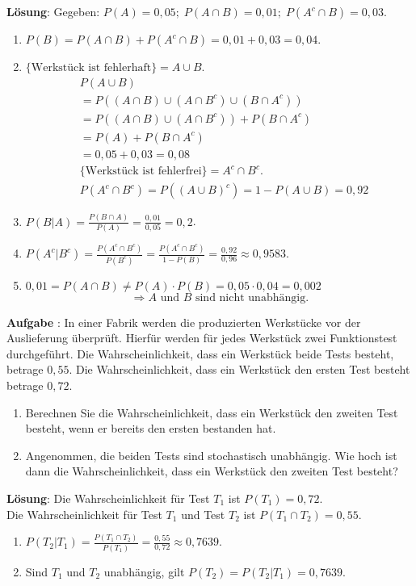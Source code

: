 \documentclass[a4paper,13pt]{scrartcl}
\newcommand{\exercise}{\vspace*{0.2cm}
\stepcounter{aufgabe}
\noindent
\textbf{Aufgabe \arabic{aufgabe}}: }
\newcounter{aufgabe}
\newcommand{\solution}{\vspace*{0.2cm}
\noindent
\textbf{Lösung}: }
\begin{document}
\solution
Gegeben: $P(A) = 0,05; \; P(A \cap B) = 0,01; \; P(A^c \cap B) = 0,03$.
\begin{enumerate}[label=(\alph*)]
\item $P(B) = P(A \cap B) + P(A^c \cap B) = 0,01 + 0,03 = 0,04$.
\item $ \{ \text{Werkstück ist fehlerhaft} \} = A \cup B$.
\begin{align*}
    & P(A \cup B) \\
    & = P((A \cap B) \cup (A \cap B^c) \cup (B \cap A^c))\\
    & = P((A \cap B) \cup (A \cap B^c)) + P(B \cap A^c)\\
    & = P(A) + P(B \cap A^c) \\
    & = 0,05 + 0,03 = 0,08\\
    & \{ \text{Werkstück ist fehlerfrei} \} = A^c \cap B^c.\\
    & P(A^c \cap B^c) = P((A \cup B)^c) = 1 - P(A \cup B)= 0,92
\end{align*}
\item $P(B | A) = \frac{P(B \cap A)}{P(A)} = \frac{0,01}{0,05} = 0,2$.
\item $P(A^c | B^c) = \frac{P(A^c \cap B^c)}{P(B^c)} = \frac{P(A^c \cap B^c)}{1 - P(B)} = \frac{0,92}{0,96} \approx 0,9583$.
\item $0,01 = P(A \cap B) \neq P(A) \cdot P(B) = 0,05 \cdot 0,04 = 0,002$ $$ \Rightarrow A \text{ und } B \text{ sind nicht unabhängig.}$$
\end{enumerate}
\vspace{8mm}


\exercise
In einer Fabrik werden die produzierten Werkstücke vor der Auslieferung überprüft. Hierfür werden für jedes Werkstück   zwei Funktionstest durchgeführt.  Die Wahrscheinlichkeit, dass ein Werkstück beide Tests besteht, betrage $0,55$. Die Wahrscheinlichkeit, dass ein Werkstück  den ersten Test besteht betrage $0,72$. 
\begin{enumerate}[label=(\alph*)]
\item Berechnen Sie die Wahrscheinlichkeit, dass ein Werkstück den zweiten Test besteht, wenn er bereits den ersten bestanden hat.
\item Angenommen, die beiden Tests sind stochastisch unabhängig. Wie hoch ist dann die Wahrscheinlichkeit, dass ein Werkstück den zweiten Test besteht?
\end{enumerate}
\vspace{4mm}

\solution
Die Wahrscheinlichkeit für  Test $T_1$  ist $P(T_1) = 0,72$.\\
Die Wahrscheinlichkeit für  Test $T_1$ und Test $T_2$ ist $P(T_1 \cap T_2) = 0,55$.
\begin{enumerate}[label=(\alph*)]
\item $P(T_2 | T_1) = \frac{P(T_1 \cap T_2)}{P(T_1)} = \frac{0,55} {0,72} \approx 0,7639$.
\item Sind $T_1$ und $T_2$ unabhängig, gilt  $P(T_2) = P(T_2 | T_1) = 0,7639$.
\end{enumerate}
\vspace{8mm}
\end{document}
